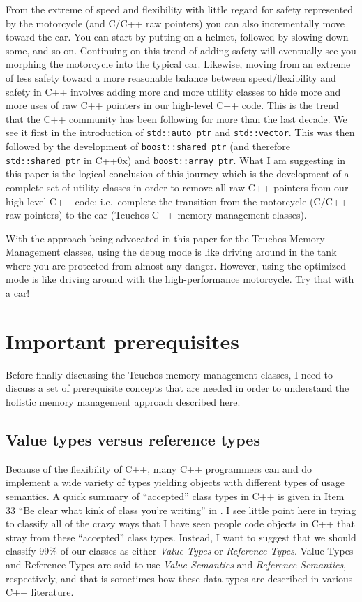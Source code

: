 \documentclass[pdf,ps2pdf,11pt]{SANDreport}
\begin{document}
From the extreme of speed and flexibility with little regard for
safety represented by the motorcycle (and C/C++ raw pointers) you can
also incrementally move toward the car.  You can start by putting on a
helmet, followed by slowing down some, and so on.  Continuing on this
trend of adding safety will eventually see you morphing the motorcycle
into the typical car.  Likewise, moving from an extreme of less safety
toward a more reasonable balance between speed/flexibility and safety
in C++ involves adding more and more utility classes to hide more and
more uses of raw C++ pointers in our high-level C++ code.  This is the
trend that the C++ community has been following for more than the last
decade.  We see it first in the introduction of
{}\texttt{std::auto\_ptr} and {}\texttt{std::vector}.  This was then
followed by the development of {}\texttt{boost::shared\_ptr} (and
therefore {}\texttt{std::shared\_ptr} in C++0x) and
{}\texttt{boost::array\_ptr}.  What I am suggesting in this paper is
the logical conclusion of this journey which is the development of a
complete set of utility classes in order to remove all raw C++
pointers from our high-level C++ code; i.e.\ complete the transition
from the motorcycle (C/C++ raw pointers) to the car (Teuchos C++
memory management classes).

With the approach being advocated in this paper for the Teuchos Memory
Management classes, using the debug mode is like driving around in the
tank where you are protected from almost any danger.  However, using
the optimized mode is like driving around with the high-performance
motorcycle.  Try that with a car!


%
{}\section{Important prerequisites}
\label{sec:important-prerequisites}
%

Before finally discussing the Teuchos memory management classes, I
need to discuss a set of prerequisite concepts that are needed in
order to understand the holistic memory management approach described
here.


%
{}\subsection{Value types versus reference types}
\label{sec:value-and-reference-types}
%

Because of the flexibility of C++, many C++ programmers can and do
implement a wide variety of types yielding objects with different types
of usage semantics.  A quick summary of ``accepted'' class types in
C++ is given in Item 33 ``Be clear what kink of class you're writing''
in {}\cite{C++CodingStandards05}.  I see little point here in trying
to classify all of the crazy ways that I have seen people code objects
in C++ that stray from these ``accepted'' class types.  Instead, I
want to suggest that we should classify 99\% of our classes as either
{}\textit{Value Types} or {}\textit{Reference Types}.  Value Types and
Reference Types are said to use {}\textit{Value Semantics} and
{}\textit{Reference Semantics}, respectively, and that is sometimes
how these data-types are described in various C++ literature.
\end{document}
